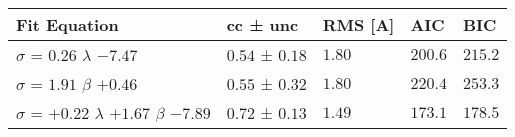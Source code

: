 \begin{tabular}{lllll}
\toprule
Fit Equation & cc ± unc & RMS [A] & AIC & BIC \\
\midrule
$\sigma$ = $0.26$ $\lambda$ $-7.47$ & $0.54$ ± $0.18$ & $1.80$ & $200.6$ & $215.2$ \\
$\sigma$ = $1.91$ $\beta$ $+0.46$ & $0.55$ ± $0.32$ & $1.80$ & $220.4$ & $253.3$ \\
$\sigma$ = $+0.22$ $\lambda$ $+1.67$ $\beta$ $-7.89$ & $0.72$ ± $0.13$ & $1.49$ & $173.1$ & $178.5$ \\
\bottomrule
\end{tabular}
